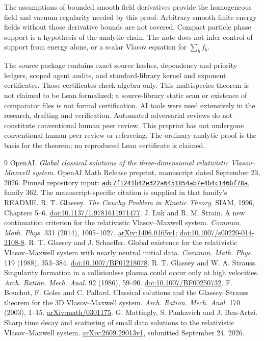 \documentclass[11pt]{article}
\theoremstyle{remark}\newtheorem{remark}[theorem]{Remark}
\numberwithin{equation}{section}
\begin{document}
The assumptions of bounded smooth field derivatives provide the homogeneous
field and vacuum regularity needed by this proof. Arbitrary smooth finite
energy fields without those derivative bounds are not covered. Compact
particle phase support is a hypothesis of the analytic chain. The note
does not infer control of support from energy alone, or a scalar Vlasov
equation for $\sum_b f_b$.

The source package contains exact source hashes, dependency and priority
ledgers, scoped agent audits, and standard-library kernel and exponent
certificates. Those certificates check algebra only. This multispecies
theorem is not claimed to be Lean formalized; a source-library static scan
or existence of comparator files is not formal certification.
AI tools were used extensively in the research, drafting and verification.
Automated adversarial reviews do not constitute conventional human peer
review. This preprint has not undergone conventional human peer review or
refereeing. The ordinary analytic proof is the basis for the theorem; no
reproduced Lean certificate is claimed.

\begin{thebibliography}{9}
 OpenAI.
\emph{Global classical solutions of the three-dimensional relativistic
Vlasov--Maxwell system}. OpenAI Math Release preprint, manuscript dated
September 23, 2026. Pinned repository input:
\href{https://github.com/openai/math/tree/adc7f1241b42e322a6451854ab7e4b4c146bf78a}{\texttt{adc7f1241b42e322a6451854ab7e4b4c146bf78a}}, family 362.
The manuscript-specific citation is supplied in that family's README.
 R. T. Glassey. \emph{The Cauchy Problem in Kinetic Theory}.
SIAM, 1996, Chapters 5--6. \href{https://doi.org/10.1137/1.9781611971477}{doi:10.1137/1.9781611971477}.
 J. Luk and R. M. Strain.
A new continuation criterion for the relativistic Vlasov--Maxwell system.
\emph{Commun. Math. Phys.} 331 (2014), 1005--1027.
\href{https://arxiv.org/abs/1406.0165v1}{arXiv:1406.0165v1};
\href{https://doi.org/10.1007/s00220-014-2108-8}{doi:10.1007/s00220-014-2108-8}.
 R. T. Glassey and J. Schaeffer.
Global existence for the relativistic Vlasov--Maxwell system with nearly
neutral initial data. \emph{Commun. Math. Phys.} 119 (1988), 353--384.
\href{https://doi.org/10.1007/BF01218078}{doi:10.1007/BF01218078}.
 R. T. Glassey and W. A. Strauss.
Singularity formation in a collisionless plasma could occur only at high
velocities. \emph{Arch. Ration. Mech. Anal.} 92 (1986), 59--90.
\href{https://doi.org/10.1007/BF00250732}{doi:10.1007/BF00250732}.
 F. Bouchut, F. Golse and C. Pallard.
Classical solutions and the Glassey--Strauss theorem for the 3D
Vlasov--Maxwell system. \emph{Arch. Ration. Mech. Anal.} 170 (2003), 1--15.
\href{https://arxiv.org/abs/math/0301175}{arXiv:math/0301175}.
 G. Mattingly, S. Pankavich and J. Ben-Artzi.
Sharp time decay and scattering of small data solutions to the relativistic
Vlasov--Maxwell system. \href{https://arxiv.org/abs/2609.29013v1}{arXiv:2609.29013v1},
submitted September 24, 2026.
\end{thebibliography}
\end{document}
